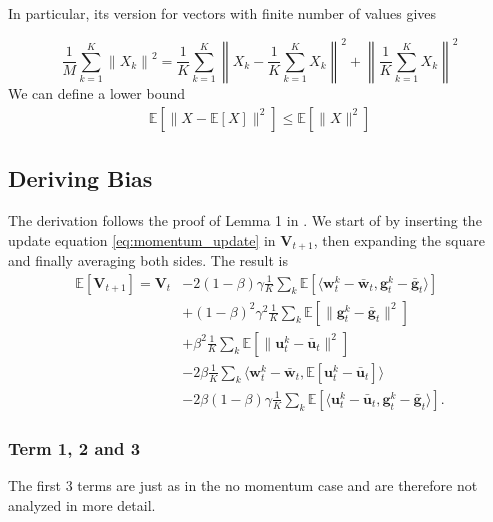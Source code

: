 \documentclass[10pt,twocolumn,letterpaper]{article}
\begin{document}
In particular, its version for vectors with finite number of values gives

$$
\frac{1}{M} \sum_{k=1}^K\left\|X_k\right\|^2=\frac{1}{K} \sum_{k=1}^K\left\|X_k-\frac{1}{K} \sum_{k=1}^K X_k\right\|^2+\left\|\frac{1}{K} \sum_{k=1}^K X_k\right\|^2
$$
We can define a lower bound
\begin{align}\label{eq:var_dec}
    \mathbb{E}\left[\|X-\mathbb{E}[X]\|^2\right] \leq \mathbb{E}\left[\|X\|^2\right]
\end{align}

\subsection{Deriving Bias}
The derivation follows the proof of Lemma 1 in \cite{khaled2022}. We start of by inserting the update equation \ref{eq:momentum_update} in $\mathbf{V}_{t+1}$, then expanding the square and finally averaging both sides. The result is
\begin{align*}
    \mathbb{E}\left[\mathbf{V}_{t+1}\right] = \mathbf{V}_t
    &- 2 (1-\beta)\gamma \frac{1}{K}\sum_k\mathbb{E}\left[\langle \mathbf{w}_t^k - \bar{\mathbf{w}}_t, \mathbf{g}_t^k - \bar{\mathbf{g}}_t \rangle \right]
    \\&+ (1-\beta)^2\gamma^2 \frac{1}{K}\sum_k\mathbb{E}\left[\|\mathbf{g}_t^k - \bar{\mathbf{g}}_t \|^2\right]
    \\&+ \beta^2 \frac{1}{K}\sum_k\mathbb{E}\left[\|\mathbf{u}_t^k - \bar{\mathbf{u}}_t \|^2\right]
    \\&-2 \beta \frac{1}{K}\sum_k \langle \mathbf{w}_t^k - \bar{\mathbf{w}}_t, \mathbb{E}\left[\mathbf{u}_t^k - \bar{\mathbf{u}}_t\right] \rangle
    \\&- 2 \beta (1-\beta)\gamma \frac{1}{K}\sum_k\mathbb{E}\left[\langle \mathbf{u}_t^k - \bar{\mathbf{u}}_t, \mathbf{g}_t^k - \bar{\mathbf{g}}_t \rangle\right].
\end{align*}
\subsubsection{Term 1, 2 and 3}
The first 3 terms are just as in the no momentum case \cite{khaled2022} and are therefore not analyzed in more detail.
\end{document}
